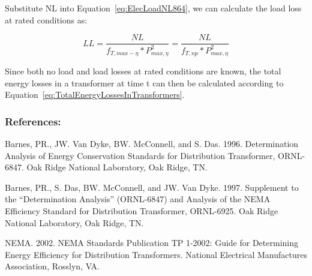 Substitute NL into Equation~\ref{eq:ElecLoadNL864}, we can calculate the load loss at rated conditions as:

\begin{equation}
LL = \frac{{NL}}{{{f_{T,max-\eta}}*P_{max,\eta}^2}} = \frac{{NL}}{{{f_{T,np}}*P_{max,\eta}^2}}
\label{eq:LoadLossAtRatedCondition}
\end{equation}

Since both no load and load losses at rated conditions are known, the total energy losses in a transformer at time t can then be calculated according to Equation~\ref{eq:TotalEnergyLossesInTransformers}.

\subsubsection{References:}\label{references-1-008}

Barnes, PR., JW. Van Dyke, BW. McConnell, and S. Das. 1996. Determination Analysis of Energy Conservation Standards for Distribution Transformer, ORNL-6847. Oak Ridge National Laboratory, Oak Ridge, TN.

Barnes, PR., S. Das, BW. McConnell, and JW. Van Dyke. 1997. Supplement to the ``Determination Analysis'' (ORNL-6847) and Analysis of the NEMA Efficiency Standard for Distribution Transformer, ORNL-6925. Oak Ridge National Laboratory, Oak Ridge, TN.

NEMA. 2002. NEMA Standards Publication TP 1-2002: Guide for Determining Energy Efficiency for Distribution Transformers. National Electrical Manufactures Association, Rosslyn, VA.
